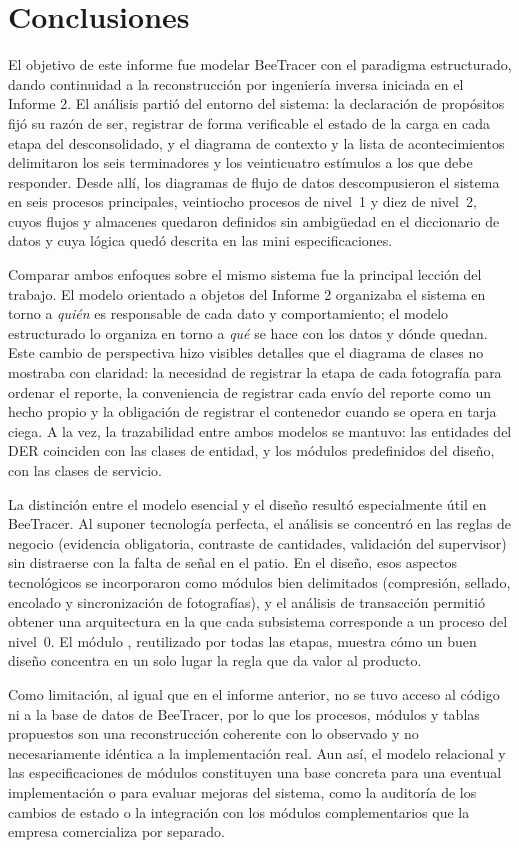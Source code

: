 \chapter{Conclusiones}
\label{cap:conclusiones}

El objetivo de este informe fue modelar BeeTracer con el paradigma estructurado, dando
continuidad a la reconstrucción por ingeniería inversa iniciada en el Informe 2. El análisis
partió del entorno del sistema: la declaración de propósitos fijó su razón de ser, registrar de
forma verificable el estado de la carga en cada etapa del desconsolidado, y el diagrama de
contexto y la lista de acontecimientos delimitaron los seis terminadores y los veinticuatro
estímulos a los que debe responder. Desde allí, los diagramas de flujo de datos descompusieron
el sistema en seis procesos principales, veintiocho procesos de nivel~1 y diez de nivel~2, cuyos
flujos y almacenes quedaron definidos sin ambigüedad en el diccionario de datos y cuya lógica
quedó descrita en las mini especificaciones.

Comparar ambos enfoques sobre el mismo sistema fue la principal lección del trabajo. El modelo
orientado a objetos del Informe 2 organizaba el sistema en torno a \emph{quién} es responsable
de cada dato y comportamiento; el modelo estructurado lo organiza en torno a \emph{qué} se hace
con los datos y dónde quedan. Este cambio de perspectiva hizo visibles detalles que el
diagrama de clases no mostraba con claridad: la necesidad de registrar la etapa de cada
fotografía para ordenar el reporte, la conveniencia de registrar cada envío del reporte como
un hecho propio y la obligación de registrar el contenedor cuando se opera en tarja ciega. A
la vez, la trazabilidad entre ambos modelos se mantuvo: las entidades del DER coinciden con las
clases de entidad, y los módulos predefinidos del diseño, con las clases de servicio.

La distinción entre el modelo esencial y el diseño resultó especialmente útil en BeeTracer.
Al suponer tecnología perfecta, el análisis se concentró en las reglas de negocio (evidencia
obligatoria, contraste de cantidades, validación del supervisor) sin distraerse con la falta
de señal en el patio. En el diseño, esos aspectos tecnológicos se incorporaron como módulos
bien delimitados (compresión, sellado, encolado y sincronización de fotografías), y el
análisis de transacción permitió obtener una arquitectura en la que cada subsistema
corresponde a un proceso del nivel~0. El módulo ,
reutilizado por todas las etapas, muestra cómo un buen diseño concentra en un solo lugar la
regla que da valor al producto.

Como limitación, al igual que en el informe anterior, no se tuvo acceso al código ni a la
base de datos de BeeTracer, por lo que los procesos, módulos y tablas propuestos son una
reconstrucción coherente con lo observado y no necesariamente idéntica a la implementación
real. Aun así, el modelo relacional y las especificaciones de módulos constituyen una base
concreta para una eventual implementación o para evaluar mejoras del sistema, como la
auditoría de los cambios de estado o la integración con los módulos complementarios que la
empresa comercializa por separado.
